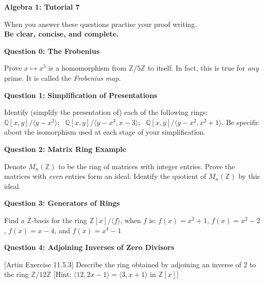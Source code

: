 \documentclass[11pt,twoside, a4paper]{report}
\theoremstyle{plain}
\theoremstyle{definition}
\begin{document}
\begin{center}
 \noindent\makebox[\linewidth]{\rule{14cm}{1.5pt}} 
{\bf Algebra 1: Tutorial 7 }
 \noindent\makebox[\linewidth]{\rule{14cm}{1.5pt}}  
 \noindent\makebox[\linewidth]{\rule{14cm}{3pt}}
\end{center}

\noindent When you answer these questions practise your proof writing.\\
  {\bf Be clear, concise, and complete.}
  
  
\begin{center}
{\bf Question 0: The Frobenius}
\end{center}

Prove $x\mapsto x^{5}$ is a homomorphism from $\mathbb{Z}/5\mathbb{Z}$ to itself. In fact, this is true for \emph{any} prime. It is called the \emph{Frobenius map}.


\begin{center}
{\bf Question 1: Simplification of Presentations}
\end{center} 

Identify (simplify the presentation of) each of the following rings: 
$\mathbb{Q}[x,y] / \langle y-x^{2} \rangle $; \
$\mathbb{Q}[x,y] / \langle y-x^{3},x-3 \rangle $; \
$\mathbb{Q}[x,y] / \langle y-x^{2},x^{2}+1 \rangle.$ Be specific about the isomorphism used at each stage of your simplification.


\begin{center}
{\bf Question 2: Matrix Ring Example}
\end{center}

Denote $M_{n}(\mathbb{Z})$ to be the ring of matrices with integer entries. Prove the matrices with \emph{even} entries form an ideal. Identify the quotient of $M_{n}(\mathbb{Z})$ by this ideal. 

\begin{center}
{\bf Question 3: Generators of Rings}
\end{center}

Find a $\mathbb{Z}$-basis for the ring $\mathbb{Z}[x]/\langle f \rangle$, when $f$ is: $f(x)= x^{2} + 1$, 
$f(x)= x^{2} - 2$,
$f(x)= x - 4$, and
$f(x)= x^{4} - 1$



\begin{center}
{\bf Question 4: Adjoining Inverses of Zero Divisors}
\end{center}

[Artin Exercise 11.5.3] Describe the ring obtained by adjoining an inverse of 2 to the ring $\mathbb{Z}/12\mathbb{Z}$ [Hint: $\langle 12, 2x - 1 \rangle = \langle 3, x+1 \rangle$ in $\mathbb{Z}[x]$] 
\end{document}
